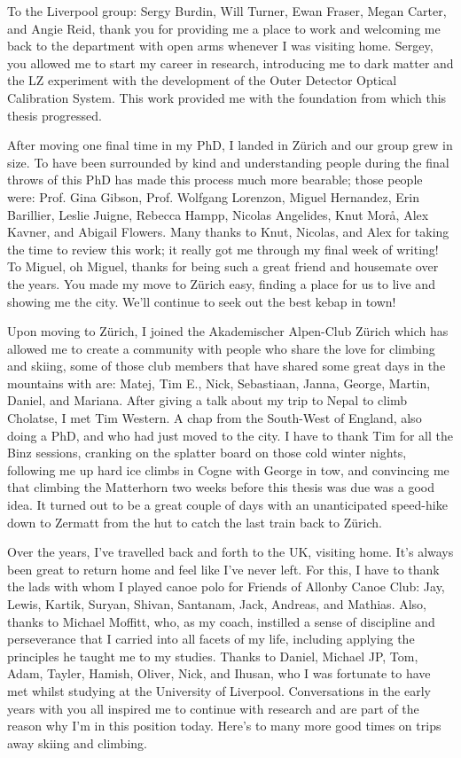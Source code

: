 \documentclass[a4paper,11pt,usegeometry]{scrreprt} %
\begin{document}
To the Liverpool group: Sergy Burdin, Will Turner, Ewan Fraser, Megan Carter, and Angie Reid, thank you for providing me a place to work and welcoming me back to the department with open arms whenever I was visiting home. Sergey, you allowed me to start my career in research, introducing me to dark matter and the LZ experiment with the development of the Outer Detector Optical Calibration System. This work provided me with the foundation from which this thesis progressed.

After moving one final time in my PhD, I landed in Z\"urich and our group grew in size. To have been surrounded by kind and understanding people during the final throws of this PhD has made this process much more bearable; those people were: Prof. Gina Gibson, Prof. Wolfgang Lorenzon, Miguel Hernandez, Erin Barillier, Leslie Juigne, Rebecca Hampp, Nicolas Angelides, Knut Mor\aa, Alex Kavner, and Abigail Flowers. Many thanks to Knut, Nicolas, and Alex for taking the time to review this work; it really got me through my final week of writing! To Miguel, oh Miguel, thanks for being such a great friend and housemate over the years. You made my move to Z\"urich easy, finding a place for us to live and showing me the city. We'll continue to seek out the best kebap in town!

Upon moving to Z\"urich, I joined the Akademischer Alpen-Club Z\"urich which has allowed me to create a community with people who share the love for climbing and skiing, some of those club members that have shared some great days in the mountains with are: Matej, Tim E., Nick, Sebastiaan, Janna, George, Martin, Daniel, and Mariana. After giving a talk about my trip to Nepal to climb Cholatse, I met Tim Western. A chap from the South-West of England, also doing a PhD, and who had just moved to the city. I have to thank Tim for all the Binz sessions, cranking on the splatter board on those cold winter nights, following me up hard ice climbs in Cogne with George in tow, and convincing me that climbing the Matterhorn two weeks before this thesis was due was a good idea. It turned out to be a great couple of days with an unanticipated speed-hike down to Zermatt from the hut to catch the last train back to Z\"urich.

Over the years, I've travelled back and forth to the UK, visiting home. It's always been great to return home and feel like I've never left. For this, I have to thank the lads with whom I played canoe polo for Friends of Allonby Canoe Club: Jay, Lewis, Kartik, Suryan, Shivan, Santanam, Jack, Andreas, and Mathias. Also, thanks to Michael Moffitt, who, as my coach, instilled a sense of discipline and perseverance that I carried into all facets of my life, including applying the principles he taught me to my studies. Thanks to Daniel, Michael JP, Tom, Adam, Tayler, Hamish, Oliver, Nick, and Ihusan, who I was fortunate to have met whilst studying at the University of Liverpool. Conversations in the early years with you all inspired me to continue with research and are part of the reason why I'm in this position today. Here's to many more good times on trips away skiing and climbing.
\end{document}
